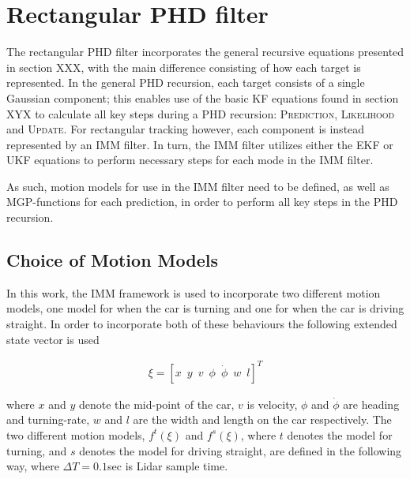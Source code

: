 \section{Rectangular PHD filter}

The rectangular PHD filter incorporates the general recursive equations presented in section XXX, with the main difference consisting of how each target is represented. In the general PHD recursion, each target consists of a single Gaussian component; this enables use of the basic KF equations found in section XYX to calculate all key steps during a PHD recursion: \textsc{Prediction}, \textsc{Likelihood} and \textsc{Update}. For rectangular tracking however, each component is instead represented by an IMM filter. In turn, the IMM filter utilizes either the EKF or UKF equations to perform necessary steps for each mode in the IMM filter. 

As such, motion models for use in the IMM filter need to be defined, as well as MGP-functions for each prediction, in order to perform all key steps in the PHD recursion. 


\subsection{Choice of Motion Models}
In this work, the IMM framework is used to incorporate two different motion models, one model for when the car is turning and one for when the car is driving straight. In order to incorporate both of these behaviours the following extended state vector is used

\begin{equation}
    \begin{split}
        \xi = [x\enspace y\enspace v\enspace \phi \enspace \dot{\phi} \enspace w \enspace l]^T
    \end{split}
\end{equation}

where $x$ and $y$ denote the mid-point of the car, $v$ is velocity, $\phi$ and $ \dot{\phi}$ are heading and turning-rate, $w$ and $l$ are the width and length on the car respectively. The two different motion models, $f^{t}(\xi)$ and $f^{s}(\xi)$, where $t$ denotes the model for turning, and $s$ denotes the model for driving straight, are defined in the following way, where $\Delta T = 0.1$sec is Lidar sample time.

